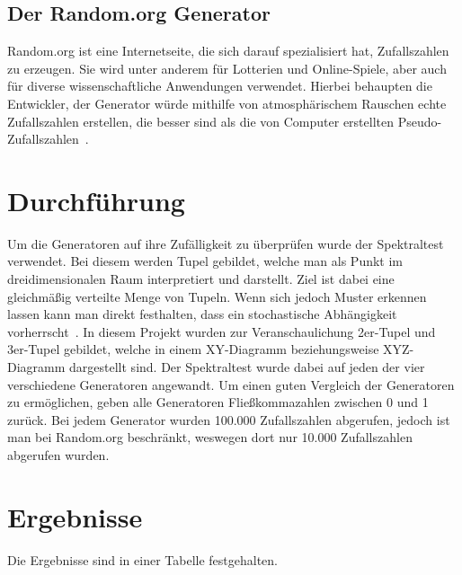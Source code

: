 \documentclass[12pt]{article}
\begin{document}
    \subsection{Der Random.org Generator}\label{subsec:der-random.org-generator}
    Random.org ist eine Internetseite, die sich darauf spezialisiert hat, Zufallszahlen zu erzeugen.
    Sie wird unter anderem für Lotterien und Online-Spiele, aber auch für diverse wissenschaftliche
    Anwendungen verwendet.
    Hierbei behaupten die Entwickler, der Generator würde mithilfe von atmosphärischem
    Rauschen echte Zufallszahlen erstellen, die besser sind als die von Computer erstellten Pseudo-Zufallszahlen~\cite{random-org}.


    \section{Durchführung}\label{sec:Durchfuehrung}
    Um die Generatoren auf ihre Zufälligkeit zu überprüfen wurde der Spektraltest verwendet.
    Bei diesem werden Tupel gebildet, welche man als Punkt im dreidimensionalen Raum interpretiert und darstellt.
    Ziel ist dabei eine gleichmäßig verteilte Menge von Tupeln.
    Wenn sich jedoch Muster erkennen lassen kann man direkt festhalten, dass ein stochastische Abhängigkeit vorherrscht~\cite{spektraltest}.
    In diesem Projekt wurden zur Veranschaulichung 2er-Tupel und 3er-Tupel gebildet,
    welche in einem XY-Diagramm beziehungsweise XYZ-Diagramm dargestellt sind.
    Der Spektraltest wurde dabei auf jeden der vier verschiedene Generatoren angewandt.
    Um einen guten Vergleich der Generatoren zu ermöglichen, geben alle Generatoren Fließkommazahlen zwischen 0 und 1 zurück.
    Bei jedem Generator wurden 100.000 Zufallszahlen abgerufen, jedoch ist man bei Random.org beschränkt,
    weswegen dort nur 10.000 Zufallszahlen abgerufen wurden.


    \section{Ergebnisse}\label{sec:Ergebnisse}
    Die Ergebnisse sind in einer Tabelle festgehalten.

    \vfill
\end{document}
